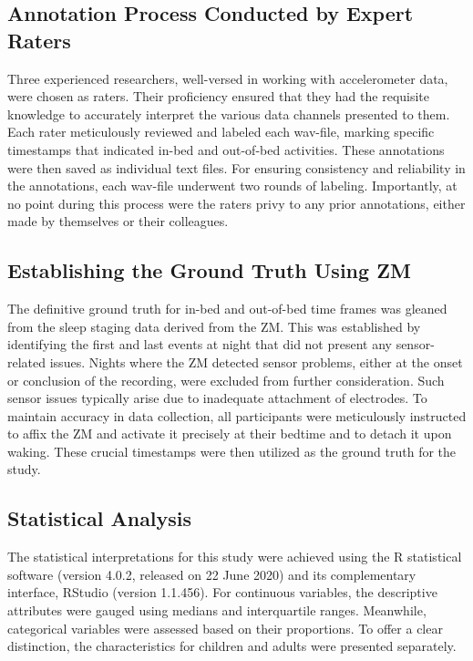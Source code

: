 \documentclass[
  9pt,
]{scrbook}
\begin{document}
\hypertarget{annotation-process-conducted-by-expert-raters}{%
\subsection{Annotation Process Conducted by Expert
Raters}\label{annotation-process-conducted-by-expert-raters}}

Three experienced researchers, well-versed in working with accelerometer
data, were chosen as raters. Their proficiency ensured that they had the
requisite knowledge to accurately interpret the various data channels
presented to them. Each rater meticulously reviewed and labeled each
wav-file, marking specific timestamps that indicated in-bed and
out-of-bed activities. These annotations were then saved as individual
text files. For ensuring consistency and reliability in the annotations,
each wav-file underwent two rounds of labeling. Importantly, at no point
during this process were the raters privy to any prior annotations,
either made by themselves or their colleagues.

\hypertarget{establishing-the-ground-truth-using-zm}{%
\subsection{Establishing the Ground Truth Using
ZM}\label{establishing-the-ground-truth-using-zm}}

The definitive ground truth for in-bed and out-of-bed time frames was
gleaned from the sleep staging data derived from the ZM. This was
established by identifying the first and last events at night that did
not present any sensor-related issues. Nights where the ZM detected
sensor problems, either at the onset or conclusion of the recording,
were excluded from further consideration. Such sensor issues typically
arise due to inadequate attachment of electrodes. To maintain accuracy
in data collection, all participants were meticulously instructed to
affix the ZM and activate it precisely at their bedtime and to detach it
upon waking. These crucial timestamps were then utilized as the ground
truth for the study.

\hypertarget{statistical-analysis}{%
\subsection{Statistical Analysis}\label{statistical-analysis}}

The statistical interpretations for this study were achieved using the R
statistical software (version 4.0.2, released on 22 June 2020) and its
complementary interface, RStudio (version 1.1.456). For continuous
variables, the descriptive attributes were gauged using medians and
interquartile ranges. Meanwhile, categorical variables were assessed
based on their proportions. To offer a clear distinction, the
characteristics for children and adults were presented separately.
\end{document}
